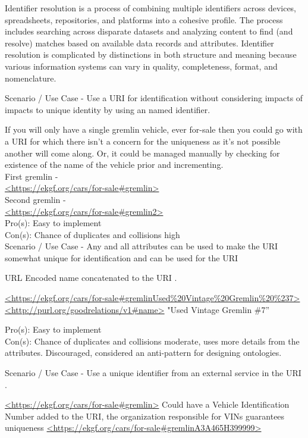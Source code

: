 %
%
Identifier resolution is a process of combining multiple identifiers across devices, spreadsheets, repositories, and
platforms into a cohesive profile.
The process includes searching across disparate datasets and analyzing content to find (and resolve) matches based
on available data records and attributes.
Identifier resolution is complicated by distinctions in both structure and meaning because various information systems
can vary in quality, completeness, format, and nomenclature.

Scenario / Use Case -
Use a URI for identification without considering impacts of impacts to unique identity by using an named identifier.

If you will only have a single gremlin vehicle, ever for-sale then you could go with a URI for which there isn’t a
concern for the uniqueness as it’s not possible another will come along.
Or, it could be managed manually by checking for existence of the name of the vehicle prior and incrementing.\\
First gremlin - \\
{\footnotesize\url{<https://ekgf.org/cars/for-sale#gremlin>}}\\
Second gremlin - \\
{\footnotesize\url{<https://ekgf.org/cars/for-sale#gremlin2>}} \\
Pro(s): Easy to implement \\
Con(s): Chance of duplicates and collisions high \\

Scenario / Use Case -
Any and all attributes can be used to make the URI somewhat unique for identification and can be used for the URI

URL Encoded name concatenated to the URI .

    {\footnotesize\url{<https://ekgf.org/cars/for-sale#gremlinUsed%20Vintage%20Gremlin%20%237>} \\ \url{<http://purl.org/goodrelations/v1#name>} "Used Vintage Gremlin \#7”}

Pro(s): Easy to implement \\
Con(s): Chance of duplicates and collisions moderate, uses more details from the attributes.
Discouraged, considered an anti-pattern for designing ontologies.

Scenario / Use Case -
Use a unique identifier from an external service in the URI .

    {\footnotesize\url{<https://ekgf.org/cars/for-sale#gremlin>}}
Could have a Vehicle Identification Number added to the URI, the organization responsible for VINs guarantees uniqueness
    {\footnotesize\url{<https://ekgf.org/cars/for-sale#gremlinA3A465H399999>}}


